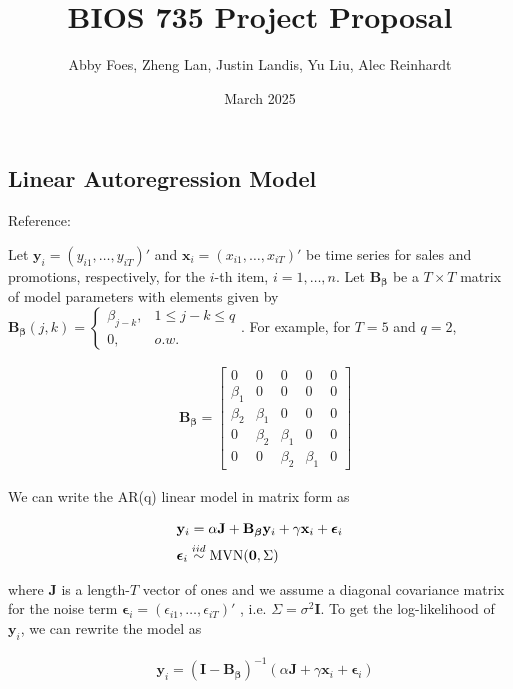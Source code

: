 \documentclass{article}
\title{BIOS 735 Project Proposal}
\author{Abby Foes, Zheng Lan, Justin Landis, Yu Liu, Alec Reinhardt}
\date{March 2025}
\begin{document}
\subsection*{Linear Autoregression Model}

\noindent Reference: %

\noindent Let $\mathbf{y}_i=(y_{i1},\ldots,y_{iT})'$ and $\mathbf{x}_i=(x_{i1},\ldots,x_{iT})'$ be time series for sales and promotions, respectively, for the $i$-th item, $i=1,\ldots,n$. Let $\mathbf{B}_{\boldsymbol{\beta}}$ be a $T\times T$ matrix of model parameters with elements given by $\mathbf{B}_{\boldsymbol{\beta}}(j,k)=\begin{cases} \beta_{j-k}, & 1 \leq j-k\leq q \\ 0, & o.w.\end{cases}$. For example, for $T=5$ and $q=2$,

\begin{align*}
    & \mathbf{B}_{\boldsymbol{\beta}} = \begin{bmatrix} 
    0 & 0 & 0 & 0 & 0 \\
    \beta_1 & 0 & 0 & 0 & 0 \\
    \beta_2 & \beta_1 & 0 & 0 & 0 \\
    0 & \beta_2 & \beta_1 & 0 & 0 \\
    0 & 0 & \beta_2 & \beta_1 & 0
    \end{bmatrix}
\end{align*}

\noindent We can write the AR(q) linear model in matrix form as 

\begin{align}
    & \mathbf{y}_i=\alpha \mathbf{J}+\mathbf{B}_{\boldsymbol{\beta}} \mathbf{y}_i+\gamma \mathbf{x}_i+\boldsymbol{\epsilon}_i\label{eq:mod1} \\
    & \boldsymbol{\epsilon}_i \overset{iid}{\sim} \text{MVN}(\boldsymbol{0}, \Sigma) \notag
\end{align}

\noindent where $\mathbf{J}$ is a length-$T$ vector of ones and we assume a diagonal covariance matrix for the noise term $\boldsymbol{\epsilon}_i=(\epsilon_{i1},\ldots,\epsilon_{iT})'$ , i.e. $\Sigma=\sigma^2 \mathbf{I}$. To get the log-likelihood of $\mathbf{y}_i$, we can rewrite the model as

\begin{align*}
    & \mathbf{y}_i=(\mathbf{I}-\mathbf{B}_{\boldsymbol{\beta}})^{-1} (\alpha \mathbf{J}+\gamma \mathbf{x}_i+\boldsymbol{\epsilon}_i)
\end{align*}
\end{document}
